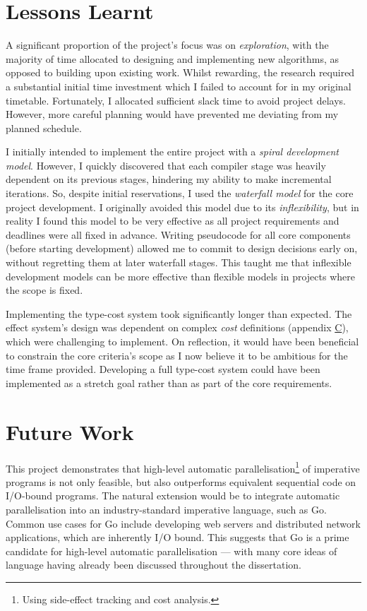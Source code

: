 \section{Lessons Learnt}

\label{sec:5.1}

A significant proportion of the project's focus was on \textit{exploration}, with the majority of time allocated to designing and implementing new algorithms, as opposed to building upon existing work. Whilst rewarding, the research required a substantial initial time investment which I failed to account for in my original timetable. Fortunately, I allocated sufficient slack time to avoid project delays. However, more careful planning would have prevented me deviating from my planned schedule.

I initially intended to implement the entire project with a \textit{spiral development model}. However, I quickly discovered that each compiler stage was heavily dependent on its previous stages, hindering my ability to make incremental iterations. So, despite initial reservations, I used the \textit{waterfall model} for the core project development. I originally avoided this model due to its \textit{inflexibility}, but in reality I found this model to be very effective as all project requirements and deadlines were all fixed in advance. Writing pseudocode for all core components (before starting development) allowed me to commit to design decisions early on, without regretting them at later waterfall stages. This taught me that inflexible development models can be more effective than flexible models in projects where the scope is fixed.

Implementing the type-cost system took significantly longer than expected. The effect system's design was dependent on complex \textit{cost} definitions (appendix \hyperref[sec:C]{C}), which were challenging to implement. On reflection, it would have been beneficial to constrain the core criteria's scope as I now believe it to be ambitious for the time frame provided. Developing a full type-cost system could have been implemented as a stretch goal rather than as part of the core requirements.

\section{Future Work}

\label{sec:5.2}

This project demonstrates that high-level automatic parallelisation\footnote{Using side-effect tracking and cost analysis.} of imperative programs is not only feasible, but also outperforms equivalent sequential code on I/O-bound programs. The natural extension would be to integrate automatic parallelisation into an industry-standard imperative language, such as Go. Common use cases for Go include developing web servers and distributed network applications, which are inherently I/O bound. This suggests that Go is a prime candidate for high-level automatic parallelisation --- with many core ideas of language having already been discussed throughout the dissertation.

